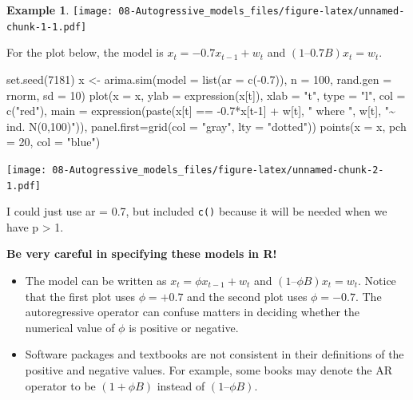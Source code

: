 \documentclass[
]{book}
\newenvironment{Shaded}{\begin{snugshade}}{\end{snugshade}}
\newcommand{\AttributeTok}[1]{\textcolor[rgb]{0.77,0.63,0.00}{#1}}
\newcommand{\DecValTok}[1]{\textcolor[rgb]{0.00,0.00,0.81}{#1}}
\newcommand{\FloatTok}[1]{\textcolor[rgb]{0.00,0.00,0.81}{#1}}
\newcommand{\FunctionTok}[1]{\textcolor[rgb]{0.00,0.00,0.00}{#1}}
\newcommand{\NormalTok}[1]{#1}
\newcommand{\OtherTok}[1]{\textcolor[rgb]{0.56,0.35,0.01}{#1}}
\newcommand{\SpecialCharTok}[1]{\textcolor[rgb]{0.00,0.00,0.00}{#1}}
\newcommand{\StringTok}[1]{\textcolor[rgb]{0.31,0.60,0.02}{#1}}
\theoremstyle{definition}
\theoremstyle{definition}
\newtheorem{example}{Example}[chapter]
\theoremstyle{definition}
\theoremstyle{definition}
\theoremstyle{remark}
\begin{document}
\begin{example}
\texttt{[image: 08-Autogressive\_models\_files/figure-latex/unnamed-chunk-1-1.pdf]}

For the plot below, the model is \(x_t = -0.7x_{t-1} + w_t\) and
\((1 – 0.7B)x_t = w_t.\)

\begin{Shaded}
\begin{Highlighting}[]
\FunctionTok{set.seed}\NormalTok{(}\DecValTok{7181}\NormalTok{)}
\NormalTok{x }\OtherTok{\textless{}{-}} \FunctionTok{arima.sim}\NormalTok{(}\AttributeTok{model =} \FunctionTok{list}\NormalTok{(}\AttributeTok{ar =} \FunctionTok{c}\NormalTok{(}\SpecialCharTok{{-}}\FloatTok{0.7}\NormalTok{)), }\AttributeTok{n =} \DecValTok{100}\NormalTok{, rand.gen }
  \OtherTok{=}\NormalTok{ rnorm, }\AttributeTok{sd =} \DecValTok{10}\NormalTok{)}
\FunctionTok{plot}\NormalTok{(}\AttributeTok{x =}\NormalTok{ x, }\AttributeTok{ylab =} \FunctionTok{expression}\NormalTok{(x[t]), }\AttributeTok{xlab =} \StringTok{"t"}\NormalTok{, }\AttributeTok{type =} 
  \StringTok{"l"}\NormalTok{, }\AttributeTok{col =} \FunctionTok{c}\NormalTok{(}\StringTok{"red"}\NormalTok{), }\AttributeTok{main =} 
  \FunctionTok{expression}\NormalTok{(}\FunctionTok{paste}\NormalTok{(x[t] }\SpecialCharTok{==} \SpecialCharTok{{-}}\FloatTok{0.7}\SpecialCharTok{*}\NormalTok{x[t}\DecValTok{{-}1}\NormalTok{] }\SpecialCharTok{+}\NormalTok{ w[t], }\StringTok{" where "}\NormalTok{, }
\NormalTok{  w[t], }\StringTok{"\textasciitilde{} ind. N(0,100)"}\NormalTok{)), }\AttributeTok{panel.first=}\FunctionTok{grid}\NormalTok{(}\AttributeTok{col =} 
  \StringTok{"gray"}\NormalTok{, }\AttributeTok{lty =} \StringTok{"dotted"}\NormalTok{))}
\FunctionTok{points}\NormalTok{(}\AttributeTok{x =}\NormalTok{ x, }\AttributeTok{pch =} \DecValTok{20}\NormalTok{, }\AttributeTok{col =} \StringTok{"blue"}\NormalTok{)}
\end{Highlighting}
\end{Shaded}

\texttt{[image: 08-Autogressive\_models\_files/figure-latex/unnamed-chunk-2-1.pdf]}

I could just use ar = 0.7, but included \texttt{c()} because it will be needed when we have p \textgreater{} 1.

\textbf{Be very careful in specifying these models in R!}
\end{example}

\begin{itemize}
\item
  The model can be written as \(x_t = \phi x_{t-1} + w_t\) and \((1 – \phi B)x_t = w_t\). Notice that the first plot uses \(\phi = +0.7\) and the second plot uses \(\phi = -0.7\). The autoregressive operator can confuse matters in deciding whether the numerical value of \(\phi\) is positive or negative.
\item
  Software packages and textbooks are not consistent in their definitions of the positive and negative values. For example, some books may denote the AR operator to be \((1 + \phi B)\) instead of \((1 – \phi B)\).
\end{itemize}
\end{document}
